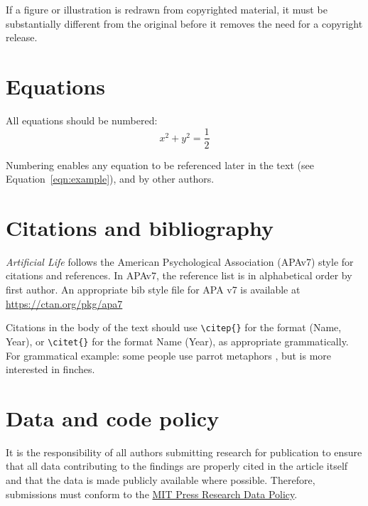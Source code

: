 \documentclass{artificial-life}
\begin{document}
If a figure or illustration is redrawn from copyrighted material, it must be substantially different from the original before it removes the need for a copyright release.



\section{Equations}

All equations should be numbered:
\begin{equation}\label{eqn:example}
    x^2 + y^2 = \frac{1}{2} %
\end{equation}

Numbering enables any equation to be referenced later in the text (see Equation~\ref{eqn:example}),
and by other authors.


\section{Citations and bibliography}

\textit{Artificial Life} follows the American Psychological Association (APAv7) style for citations and references. 
In APAv7, the reference list is in alphabetical order by first author.
An appropriate bib style file for APA v7 is available at  \url{https://ctan.org/pkg/apa7}

Citations in the body of the text should use \verb|\citep{}| for the format (Name, Year), or \verb|\citet{}| for the format Name (Year), as appropriate grammatically. 
For grammatical example: some people use parrot metaphors
\citep{bender_dangers_2021}, but 
\citet{darwin_origin_1859} is more interested in finches.



\section{Data and code policy}

It is the responsibility of all authors submitting research for publication to ensure that all data contributing to the findings are properly cited in the article itself and that the data is made publicly available where possible.  Therefore, submissions must conform to the \href{https://direct.mit.edu/journals/pages/authors#data}{MIT Press Research Data Policy}.




\printbibliography
\end{document}
